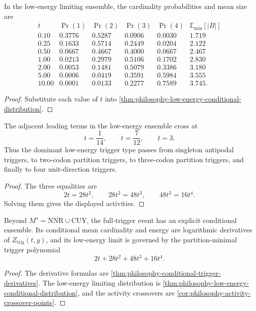 \begin{theorem}
\label{thm:philosophy-low-energy-crossover-table}
In the low-energy limiting ensemble, the cardinality probabilities and
mean size are
$$
\begin{array}{c|rrrr|r}
  t & \Pr(1) & \Pr(2) & \Pr(3) & \Pr(4) & \mathbb{E}_{\min}[|B|]\\
  \hline
  0.10 & 0.3776 & 0.5287 & 0.0906 & 0.0030 & 1.719\\
  0.25 & 0.1633 & 0.5714 & 0.2449 & 0.0204 & 2.122\\
  0.50 & 0.0667 & 0.4667 & 0.4000 & 0.0667 & 2.467\\
  1.00 & 0.0213 & 0.2979 & 0.5106 & 0.1702 & 2.830\\
  2.00 & 0.0053 & 0.1481 & 0.5079 & 0.3386 & 3.180\\
  5.00 & 0.0006 & 0.0419 & 0.3591 & 0.5984 & 3.555\\
  10.00 & 0.0001 & 0.0133 & 0.2277 & 0.7589 & 3.745.
\end{array}
$$
\end{theorem}
\begin{proof}
Substitute each value of $t$ into
\autoref{thm:philosophy-low-energy-conditional-distribution}.
\end{proof}

\begin{corollary}
\label{cor:philosophy-activity-crossover-points}
The adjacent leading terms in the low-energy ensemble cross at
$$
  t=\frac{1}{14},\qquad
  t=\frac{7}{12},\qquad
  t=3.
$$
Thus the dominant low-energy trigger type passes from singleton
antipodal triggers, to two-codon partition triggers, to three-codon
partition triggers, and finally to four unit-direction triggers.
\end{corollary}
\begin{proof}
The three equalities are
$$
  2t=28t^{2},
  \qquad
  28t^{2}=48t^{3},
  \qquad
  48t^{3}=16t^{4}.
$$
Solving them gives the displayed activities.
\end{proof}

\begin{theorem}
\label{thm:philosophy-conditional-trigger-ensemble-theorem}
Beyond $M^{\star}=\mathrm{NNR}\cup\mathrm{CUY}$, the full-trigger event
has an explicit conditional ensemble. Its conditional mean cardinality
and energy are logarithmic derivatives of
$Z_{\mathrm{trig}}(t,y)$, and its low-energy limit is governed by the
partition-minimal trigger polynomial
$$
  2t+28t^{2}+48t^{3}+16t^{4}.
$$
\end{theorem}
\begin{proof}
The derivative formulas are
\autoref{thm:philosophy-conditional-trigger-derivatives}. The
low-energy limiting distribution is
\autoref{thm:philosophy-low-energy-conditional-distribution}, and the
activity crossovers are
\autoref{cor:philosophy-activity-crossover-points}.
\end{proof}

